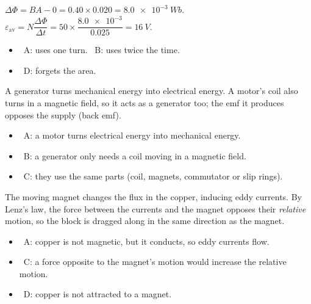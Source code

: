 \documentclass[12pt]{article}
\begin{document}
\begin{practiceanswers}
\begin{practiceans}
  $\Delta\Phi = BA - 0 = 0.40 \times 0.020 = \qty{8.0e-3}{Wb}$.
  $\varepsilon_\mathrm{av} = N\dfrac{\Delta\Phi}{\Delta t} = 50 \times \dfrac{\num{8.0e-3}}{0.025} = \qty{16}{V}$.
  \begin{itemize}
    \item \xmark\ A: uses one turn. \quad \xmark\ B: uses twice the time.
    \item \xmark\ D: forgets the area.
  \end{itemize}
\end{practiceans}

\begin{practiceans}
  A generator turns mechanical energy into electrical energy. A motor's coil also turns in a magnetic
  field, so it acts as a generator too; the emf it produces opposes the supply (back emf).
  \begin{itemize}
    \item \xmark\ A: a motor turns electrical energy into mechanical energy.
    \item \xmark\ B: a generator only needs a coil moving in a magnetic field.
    \item \xmark\ C: they use the same parts (coil, magnets, commutator or slip rings).
  \end{itemize}
\end{practiceans}

\begin{practiceans}
  The moving magnet changes the flux in the copper, inducing eddy currents. By Lenz's law, the force
  between the currents and the magnet opposes their \emph{relative} motion, so the block is dragged
  along in the same direction as the magnet.
  \begin{itemize}
    \item \xmark\ A: copper is not magnetic, but it conducts, so eddy currents flow.
    \item \xmark\ C: a force opposite to the magnet's motion would increase the relative motion.
    \item \xmark\ D: copper is not attracted to a magnet.
  \end{itemize}
\end{practiceans}

\end{practiceanswers}
\end{document}
